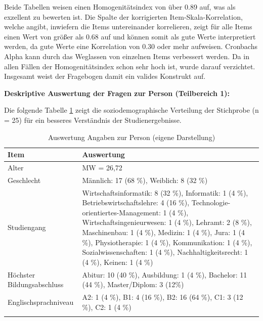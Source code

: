 Beide Tabellen weisen einen Homogenitätsindex von über 0.89 auf, was 
als exzellent zu bewerten ist. \parencite[344]{blanz.2021} 
Die Spalte der korrigierten Item-Skala-Korrelation, welche angibt, inwiefern die Items untereinander 
korrelieren, zeigt für alle Items einen Wert von größer als 0.68 auf und können somit als gute Werte 
interpretiert werden, da gute Werte eine Korrelation von 0.30 oder mehr aufweisen. \parencite[344]{blanz.2021} 
Cronbachs Alpha kann durch das Weglassen von einzelnen Items verbessert werden. Da in allen 
Fällen der Homogenitätsindex schon sehr hoch ist, wurde darauf verzichtet.
Insgesamt weist der Fragebogen damit ein valides Konstrukt auf.

\pagebreak

\textbf{Deskriptive Auswertung der Fragen zur Person (Teilbereich 1): }

Die folgende Tabelle \ref{tab:/Auswertung_Angaben_zur_Person} zeigt 
die soziodemographische Verteilung der Stichprobe (n = 25) für ein besseres 
Verständnis der Studienergebnisse.

\begingroup
\footnotesize 
\begin{longtable}{|m{4cm}|m{10cm}|}
    \hline
    \rowcolor[HTML]{EFEFEF} 
    \centering \textbf{Item} & \centering \arraybackslash \textbf{Auswertung}\\    \hline \hline
    \centering Alter & MW = 26,72                     \\ \hline
    \centering Geschlecht & Männlich: 17 (68 \%), Weiblich: 8 (32 \%)                 \\ \hline
    \centering Studiengang & Wirtschaftsinformatik: 8 (32 \%), Informatik: 1 (4 \%), Betriebswirtschaftslehre: 4 (16 \%), Technologie-orientiertes-Management: 1 (4 \%), Wirtschaftsingenieurwesen: 1 (4 \%), Lehramt: 2 (8 \%), 
    Maschinenbau: 1 (4 \%), Medizin: 1 (4 \%), Jura: 1 (4 \%), Physiotherapie: 1 (4 \%), Kommunikation: 1 (4 \%), Sozialwissenschaften: 1 (4 \%), Nachhaltigkeitsrecht: 1 (4 \%), Keinen: 1 (4 \%)       \\ \hline
    \centering Höchster Bildungsabschluss & Abitur: 10 (40 \%), Ausbildung: 1 (4 \%), Bachelor: 11 (44 \%), Master/Diplom: 3 (12\%)               \\ \hline
    \centering \arraybackslash Englischsprachniveau & A2: 1 (4 \%), B1: 4 (16 \%), B2: 16 (64 \%), C1: 3 (12 \%), C2: 1 (4 \%)             \\ \hline
    \caption[Auswertung: Angaben zur Person]{Auswertung Angaben zur Person (eigene Darstellung)} 
    \label{tab:/Auswertung_Angaben_zur_Person}
\end{longtable}
\endgroup

